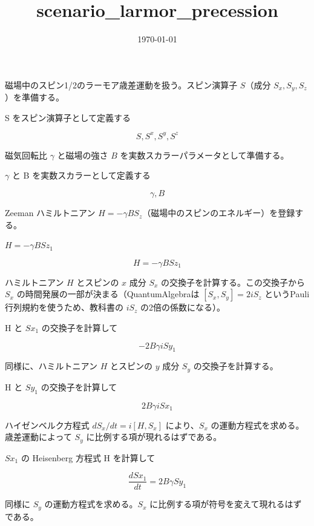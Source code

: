 \documentclass[dvipdfmx,a4paper,11pt]{jsarticle}
\title{scenario\_larmor\_precession}
\date{\today}
\begin{document}
\maketitle

磁場中のスピン1/2のラーモア歳差運動を扱う。スピン演算子 $S$（成分 $S_x,S_y,S_z$）を準備する。

S をスピン演算子として定義する

\[
  S, S^{x}, S^{y}, S^{z}
\]

磁気回転比 $\gamma$ と磁場の強さ $B$ を実数スカラーパラメータとして準備する。

$\gamma$ と B を実数スカラーとして定義する

\[
  \gamma, B
\]

Zeeman ハミルトニアン $H=-\gamma BS_z$（磁場中のスピンのエネルギー）を登録する。

$H = -\gamma B Sz_1$

\begin{equation}
  H = -\gamma B Sz_1
  \label{eq:E1}
\end{equation}

ハミルトニアン $H$ とスピンの $x$ 成分 $S_x$ の交換子を計算する。この交換子から $S_x$ の時間発展の一部が決まる（QuantumAlgebraは $[S_x,S_y]=2iS_z$ というPauli行列規約を使うため、教科書の $iS_z$ の2倍の係数になる）。

H と $Sx_1$ の交換子を計算して

\begin{equation}
  - 2 B \gamma \mathit{i} Sy_1
  \label{eq:E2}
\end{equation}

同様に、ハミルトニアン $H$ とスピンの $y$ 成分 $S_y$ の交換子を計算する。

H と $Sy_1$ の交換子を計算して

\begin{equation}
  2 B \gamma \mathit{i} Sx_1
  \label{eq:E3}
\end{equation}

ハイゼンベルク方程式 $dS_x/dt=i[H,S_x]$ により、$S_x$ の運動方程式を求める。歳差運動によって $S_y$ に比例する項が現れるはずである。

$Sx_1$ の Heisenberg 方程式 H を計算して

\begin{equation}
  \frac{d Sx_1}{d t} = 2 B \gamma Sy_1
  \label{eq:E4}
\end{equation}

同様に $S_y$ の運動方程式を求める。$S_x$ に比例する項が符号を変えて現れるはずである。
\end{document}

